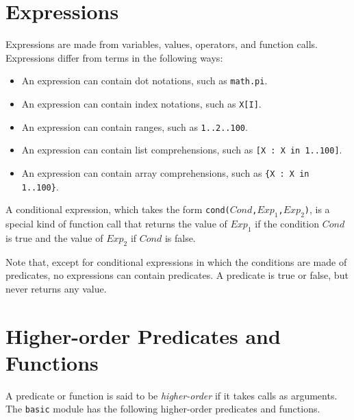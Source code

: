 \section{Expressions}
Expressions are made from variables, values, operators, and function calls. Expressions differ from terms in the following ways: 
\begin{itemize}
\item An expression can contain dot notations, such as \texttt{math.pi}.
\item An expression can contain index notations, such as \texttt{X[I]}.
\item An expression can contain ranges, such as \texttt{1..2..100}.
\item An expression can contain list comprehensions, such as \texttt{[X : X in 1..100]}.
\item An expression can contain array comprehensions, such as \texttt{\{X : X in 1..100\}}.
\end{itemize}

A conditional expression, which takes the form \texttt{cond($Cond$,$Exp_1$,$Exp_2$)}, is a special kind of function call that returns the value of $Exp_1$ if the condition $Cond$ is true and the value of $Exp_2$ if $Cond$ is false.

Note that, except for conditional expressions in which the conditions are made of predicates, no expressions can contain predicates. A predicate is true or false, but never returns any value.


\section{Higher-order Predicates and Functions}
A predicate or function is said to be \emph{higher-order} if it takes calls as arguments. The \texttt{basic} module has the following higher-order predicates and functions.

